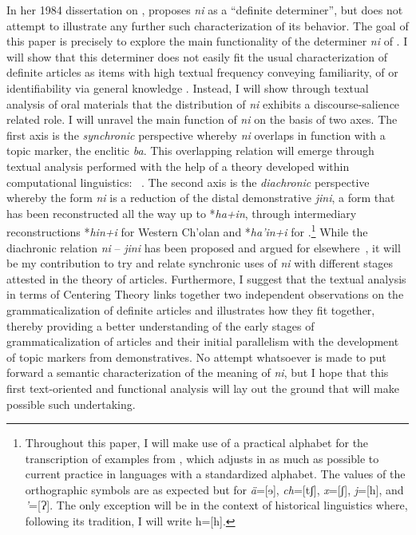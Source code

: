 \documentclass[output=paper
,modfonts
,nonflat]{langsci/langscibook}
\begin{document}
In her 1984 dissertation on  ,  \cite[209]{Knowles1984} proposes \textit{ni} as a ``definite determiner'', but does not attempt to illustrate any further such characterization of its behavior. The goal of this paper is precisely to explore the main functionality of the determiner \textit{ni} of . I will show that this determiner does not easily fit the usual characterization of definite articles as items with high textual frequency conveying familiarity,  of  or identifiability via general knowledge \citep[832]{Himmelmann2001}. Instead, I will show through textual analysis of oral materials that the distribution of \textit{ni} exhibits a discourse-salience related role. I will unravel the main function of \textit{ni} on the basis of two axes. The first axis is the \textit{synchronic} perspective whereby \textit{ni} overlaps in function with a topic marker, the enclitic \textit{ba}. This overlapping relation will emerge through textual analysis performed with the help of a theory developed within computational linguistics: ~\citep{GroszEtAlii1995}. The second axis is the \textit{diachronic} perspective whereby the form \textit{ni} is a reduction of the distal demonstrative \textit{jini}, a form that has been reconstructed all the way up to  *\textit{ha+in}, through intermediary reconstructions *\textit{hin+i} for Western Ch'olan and *\textit{ha'in+i} for .\footnote{Throughout this paper, I will make use of a practical alphabet for the transcription of examples from , which adjusts in as much as possible to current practice in  languages with a standardized alphabet. The values of the orthographic symbols are as expected but for \textit{ä}=[ɘ], \textit{ch}=[tʃ], \textit{x}=[ʃ], \textit{j}=[h], and \textit{’}=[Ɂ].  The only exception will be in the context of  historical linguistics where, following its tradition, I will write h=[h].} While the diachronic relation \textit{ni} -- \textit{jini} has been proposed and argued for elsewhere~\citep{Mora-Marin2009}, it will be my contribution to try and relate synchronic uses of \textit{ni} with different stages attested in the  theory of articles. Furthermore, I suggest that the textual analysis in terms of Centering Theory links together two independent observations on the grammaticalization of definite articles and illustrates how they fit together, thereby providing a better understanding of the early stages of grammaticalization of articles and their initial parallelism with the development of topic markers from demonstratives. No attempt whatsoever is made to put forward a semantic characterization of the meaning of \textit{ni}, but I hope that this first text-oriented and functional analysis will lay out the ground that will make possible such undertaking.
\end{document}
